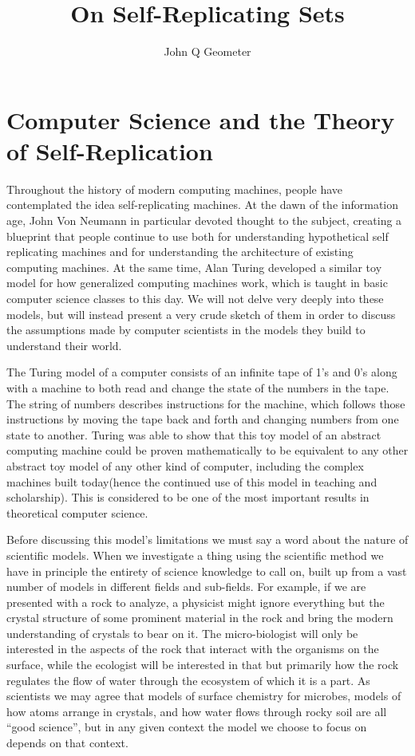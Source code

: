 \documentclass[12pt,a4paper]{amsart}
\numberwithin{equation}{section}
\begin{document}
\title{On Self-Replicating Sets}

\author{John Q Geometer}

\maketitle

\section{Computer Science and the Theory of
Self-Replication}\label{computer-science-and-the-theory-of-self-replication}

Throughout the history of modern computing machines, people have
contemplated the idea self-replicating machines. At the dawn of the
information age, John Von Neumann in particular devoted thought to the
subject, creating a blueprint that people continue to use both for
understanding hypothetical self replicating machines and for
understanding the architecture of existing computing machines. At the
same time, Alan Turing developed a similar toy model for how generalized
computing machines work, which is taught in basic computer science
classes to this day. We will not delve very deeply into these models,
but will instead present a very crude sketch of them in order to discuss
the assumptions made by computer scientists in the models they build to
understand their world.

The Turing model of a computer consists of an infinite tape of 1's and
0's along with a machine to both read and change the state of the
numbers in the tape. The string of numbers describes instructions for
the machine, which follows those instructions by moving the tape back
and forth and changing numbers from one state to another. Turing was
able to show that this toy model of an abstract computing machine could
be proven mathematically to be equivalent to any other abstract toy
model of any other kind of computer, including the complex machines
built today(hence the continued use of this model in teaching and
scholarship). This is considered to be one of the most important results
in theoretical computer science.

Before discussing this model's limitations we must say a word about the
nature of scientific models. When we investigate a thing using the
scientific method we have in principle the entirety of science knowledge
to call on, built up from a vast number of models in different fields
and sub-fields. For example, if we are presented with a rock to analyze,
a physicist might ignore everything but the crystal structure of some
prominent material in the rock and bring the modern understanding of
crystals to bear on it. The micro-biologist will only be interested in
the aspects of the rock that interact with the organisms on the surface,
while the ecologist will be interested in that but primarily how the
rock regulates the flow of water through the ecosystem of which it is a
part. As scientists we may agree that models of surface chemistry for
microbes, models of how atoms arrange in crystals, and how water flows
through rocky soil are all ``good science'', but in any given context
the model we choose to focus on depends on that context.
\end{document}
